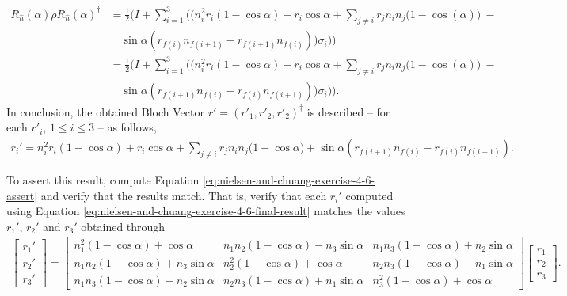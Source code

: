 \begin{align}
    R_{\hat n}(\alpha) \rho R_{\hat n}(\alpha)^\dagger &= \frac{1}{2} \Bigg(
        I + \sum_{i = 1}^3 \bigg( \Big(
            n_i^2r_i(1 - \cos\alpha) +
            r_i \cos\alpha +
            \sum_{j \neq i} r_j n_i n_j \big(
                 1 - \cos(\alpha)
            \big)\ - \nonumber \\
            &\quad
            \sin\alpha (r_{f(i)}n_{f(i + 1)} - r_{f(i+1)}n_{f(i)})
        \Big) \sigma_i \bigg)
    \Bigg)
    \\
    &= \frac{1}{2} \Bigg(
        I + \sum_{i = 1}^3 \bigg( \Big(
            n_i^2r_i(1 - \cos\alpha) +
            r_i \cos\alpha +
            \sum_{j \neq i} r_j n_i n_j \big(
                 1 - \cos(\alpha)
            \big)\ - \nonumber \\
            &\quad
            \sin\alpha (r_{f(i+1)}n_{f(i)} - r_{f(i)}n_{f(i + 1)})
        \Big) \sigma_i \bigg)
    \Bigg).
\end{align}
In conclusion,
the obtained Bloch Vector $r' = (r'_1, r'_2, r'_2)^\dagger$ is described --
for each $r'_i$, $1 \leq i \leq 3$ -- as follows,
\begin{align}
    r_i' = n_i^2r_i(1 - \cos\alpha) +
            r_i \cos\alpha +
            \sum_{j \neq i} r_j n_i n_j \big(
                1 - \cos\alpha
            \big) +
            \sin\alpha (r_{f(i+1)}n_{f(i)} - r_{f(i)}n_{f(i + 1)}) .
    \label{eq:nielsen-and-chuang-exercise-4-6-final-result}
\end{align}

To assert this result, compute Equation \ref{eq:nielsen-and-chuang-exercise-4-6-assert}
and verify that the results match.
That is, verify that each $r_i'$ computed using
Equation \ref{eq:nielsen-and-chuang-exercise-4-6-final-result} matches
the values $r_1'$, $r_2'$ and $r_3'$ obtained through
\begin{align}
    \left[ \begin{matrix}
        r_1' \\ r_2' \\ r_3'
    \end{matrix} \right] =
    \left[ \begin{matrix}
        n_1^2 (1 - \cos\alpha) + \cos\alpha &
        n_1 n_2 (1 - \cos\alpha) - n_3 \sin\alpha &
        n_1 n_3 (1 - \cos\alpha) + n_2 \sin\alpha
        \\
        n_1 n_2 (1 - \cos\alpha) + n_3 \sin\alpha &
        n_2^2 (1 - \cos\alpha) + \cos\alpha &
        n_2 n_3 (1 - \cos\alpha) - n_1 \sin\alpha
        \\
        n_1 n_3 (1 - \cos\alpha) - n_2 \sin\alpha &
        n_2 n_3 (1 - \cos\alpha) + n_1 \sin\alpha &
        n_3^2 (1 - \cos\alpha) + \cos\alpha
    \end{matrix} \right]
    \left[ \begin{matrix}
        r_1 \\ r_2 \\ r_3
    \end{matrix} \right].
\end{align}

